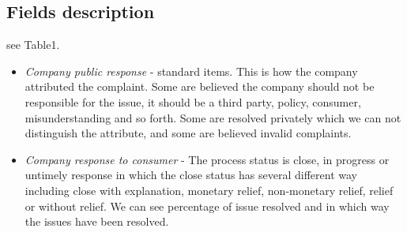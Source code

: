 \documentclass[conference]{IEEEtran}
\begin{document}
\subsection{Fields description}\label{AA}
see Table1.
\begin{itemize}
\item \textit{Company public response} - standard items. This is how the company attributed the complaint. Some are believed the company should not be responsible for the issue, it should be a third party, policy, consumer, misunderstanding and so forth. Some are resolved privately which we can not distinguish the attribute, and some are believed invalid complaints.
\item \textit{Company response to consumer} - The process status is close, in progress or untimely response in which the close status has several different way including close with explanation, monetary relief, non-monetary relief, relief or without relief. We can see percentage of issue resolved and in which way the issues have been resolved.  

\end{itemize}
\end{document}
